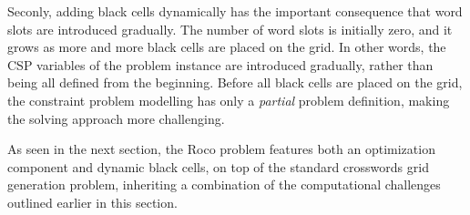 Seconly, adding black cells dynamically has the important consequence that
word slots are introduced gradually.
The number of word slots is initially zero, and it grows
as more and more black cells are placed on the grid.
In other words, the CSP variables of the problem instance are introduced gradually,
rather than being all defined from the beginning.
Before all black cells are placed on the grid, 
the constraint problem modelling has only a \emph{partial} problem definition,
making the solving approach more challenging.

As seen in the next section, the {\sc Roco} problem features both 
an optimization component and dynamic black cells, on top of the
standard crosswords grid generation problem,
inheriting a combination of 
the computational challenges outlined earlier in this section.
